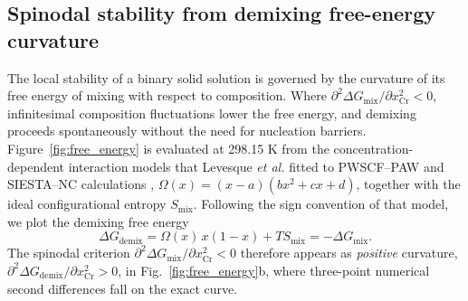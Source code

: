 \documentclass[final,3p,times]{elsarticle}
\begin{document}
\subsection{Spinodal stability from demixing free-energy curvature}

The local stability of a binary solid solution is governed by the curvature of its free energy of mixing with respect to composition. Where $\partial^2 \Delta G_{\mathrm{mix}}/\partial x_{\mathrm{Cr}}^2 < 0$, infinitesimal composition fluctuations lower the free energy, and demixing proceeds spontaneously without the need for nucleation barriers. Figure~\ref{fig:free_energy} is evaluated at 298.15 K from the concentration-dependent interaction models that Levesque \textit{et al.} fitted to PWSCF--PAW and SIESTA--NC calculations \cite{levesque2011simple}, $\Omega(x)=(x-a)(bx^2+cx+d)$, together with the ideal configurational entropy $S_{\mathrm{mix}}$. Following the sign convention of that model, we plot the demixing free energy
\begin{equation}
\Delta G_{\mathrm{demix}} = \Omega(x)\,x(1-x) + T S_{\mathrm{mix}} = -\Delta G_{\mathrm{mix}}.
\label{eqn:demix}
\end{equation}
The spinodal criterion $\partial^2 \Delta G_{\mathrm{mix}}/\partial x_{\mathrm{Cr}}^2 < 0$ therefore appears as \emph{positive} curvature, $\partial^2 \Delta G_{\mathrm{demix}}/\partial x_{\mathrm{Cr}}^2 > 0$, in Fig.~\ref{fig:free_energy}b, where three-point numerical second differences fall on the exact curve.
\end{document}
